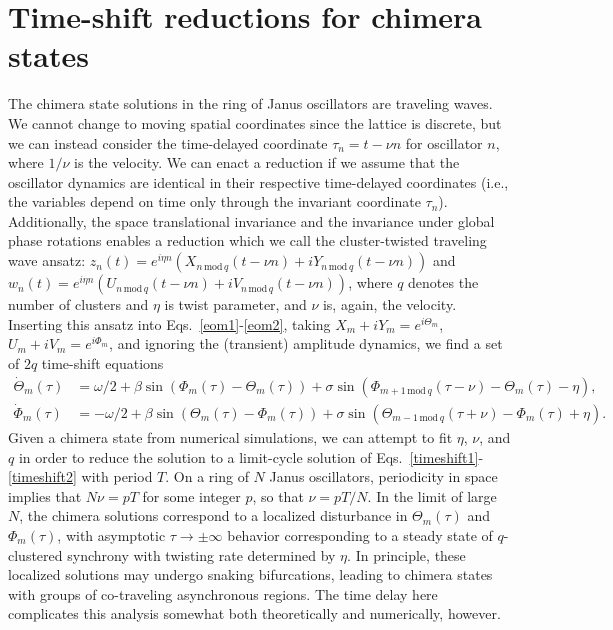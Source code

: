 \documentclass[aps,pre,amsmath,amssymb,floatfix,onecolumn,notitlepage,10pt]{revtex4-1}
\begin{document}
\section{Time-shift reductions for chimera states}
The chimera state solutions in the ring of Janus oscillators are traveling waves. We cannot change to moving spatial coordinates since the lattice is discrete, but we can instead consider the time-delayed coordinate $\tau_n = t - \nu n$ for oscillator $n$, where $1/\nu$ is the velocity. We can enact a reduction if we assume that the oscillator dynamics are identical in their respective time-delayed coordinates (i.e., the variables depend on time only through the invariant coordinate $\tau_n$). Additionally, the space translational invariance and the invariance under global phase rotations enables a reduction which we call the cluster-twisted traveling wave ansatz: $z_n(t) = e^{i\eta n}\left(X_{n\,\text{mod}\,q}(t-\nu n)+iY_{n\,\text{mod}\,q}(t-\nu n)\right)$ and $w_n(t) = e^{i\eta n}\left(U_{n\,\text{mod}\,q}(t-\nu n)+iV_{n\,\text{mod}\,q}(t-\nu n)\right)$, where $q$ denotes the number of clusters and $\eta$ is twist parameter, and $\nu$ is, again, the velocity.  Inserting this ansatz into Eqs.~\eqref{eom1}-\eqref{eom2}, taking $X_m + iY_m = e^{i\Theta_m}$, $U_m+iV_m=e^{i\Phi_m}$, and ignoring the (transient) amplitude dynamics, we find a set of $2q$ time-shift equations
\begin{align}
\dot{\Theta}_m(\tau) &= \omega/2 + \beta\sin(\Phi_m(\tau)-\Theta_m(\tau)) + \sigma\sin(\Phi_{m+1\, \text{mod}\, q}(\tau-\nu) -\Theta_m(\tau)-\eta), \label{timeshift1} \\
\dot{\Phi}_m(\tau) &= -\omega/2 + \beta\sin(\Theta_m(\tau)-\Phi_m(\tau)) + \sigma\sin(\Theta_{m-1\, \text{mod}\, q}(\tau+\nu) -\Phi_m(\tau)+\eta). \label{timeshift2}
\end{align}
Given a chimera state from numerical simulations, we can attempt to fit $\eta$, $\nu$, and $q$ in order to reduce the solution to a limit-cycle solution of Eqs.~\eqref{timeshift1}-\eqref{timeshift2} with period $T$. On a ring of $N$ Janus oscillators, periodicity in space implies that $N\nu = p T$ for some integer $p$, so that $\nu = pT/N$. In the limit of large $N$, the chimera solutions correspond to a localized disturbance in $\Theta_m(\tau)$ and $\Phi_m(\tau)$, with asymptotic $\tau \to \pm \infty$ behavior corresponding to a steady state of $q$-clustered synchrony with twisting rate determined by $\eta$. In principle, these localized solutions may undergo snaking bifurcations, leading to chimera states with groups of co-traveling asynchronous regions. The time delay here complicates this analysis somewhat both theoretically and numerically, however.
\end{document}
